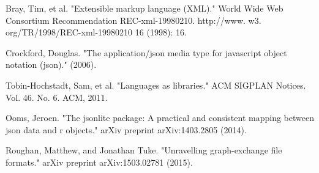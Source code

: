 \documentclass[journal]{IEEEtran}
\begin{document}
\begin{thebibliography}{4}

Bray, Tim, et al. "Extensible markup language (XML)." World Wide Web Consortium Recommendation REC-xml-19980210. http://www. w3. org/TR/1998/REC-xml-19980210 16 (1998): 16.

Crockford, Douglas. "The application/json media type for javascript object notation (json)." (2006).

Tobin-Hochstadt, Sam, et al. "Languages as libraries." ACM SIGPLAN Notices. Vol. 46. No. 6. ACM, 2011.

Ooms, Jeroen. "The jsonlite package: A practical and consistent mapping between json data and r objects." arXiv preprint arXiv:1403.2805 (2014).

Roughan, Matthew, and Jonathan Tuke. "Unravelling graph-exchange file formats." arXiv preprint arXiv:1503.02781 (2015).

\end{thebibliography}

\ifCLASSOPTIONcaptionsoff
  \newpage
\fi
\end{document}
